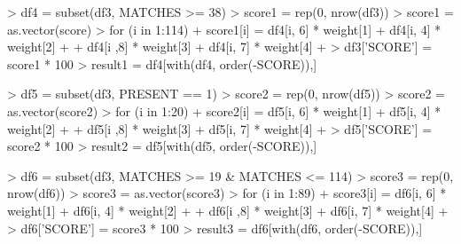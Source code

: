 \documentclass[12pt,a4paper]{article}
\begin{document}
\begin{Schunk}
\begin{Sinput}
> df4 = subset(df3, MATCHES >= 38)
> score1 = rep(0, nrow(df3))
> score1 = as.vector(score)
> for (i in 1:114) {
+     score1[i] = df4[i, 6] * weight[1] + df4[i, 4] * weight[2]
+     + df4[i ,8] * weight[3] + df4[i, 7] * weight[4]
+ }
> df3['SCORE'] = score1 * 100
> result1 = df4[with(df4, order(-SCORE)),]
\end{Sinput}
\end{Schunk}

\begin{Schunk}
\begin{Sinput}
> df5 = subset(df3, PRESENT == 1)
> score2 = rep(0, nrow(df5))
> score2 = as.vector(score2)
> for (i in 1:20) {
+     score2[i] = df5[i, 6] * weight[1] + df5[i, 4] * weight[2]
+     + df5[i ,8] * weight[3] + df5[i, 7] * weight[4]
+ }
> df5['SCORE'] = score2 * 100
> result2 = df5[with(df5, order(-SCORE)),]
\end{Sinput}
\end{Schunk}

\begin{Schunk}
\begin{Sinput}
> df6 = subset(df3, MATCHES >= 19 & MATCHES <= 114)
> score3 = rep(0, nrow(df6))
> score3 = as.vector(score3)
> for (i in 1:89) {
+     score3[i] = df6[i, 6] * weight[1] + df6[i, 4] * weight[2]
+     + df6[i ,8] * weight[3] + df6[i, 7] * weight[4]
+ }
> df6['SCORE'] = score3 * 100
> result3 = df6[with(df6, order(-SCORE)),]
\end{Sinput}
\end{Schunk}
    
\newpage


\end{document}
